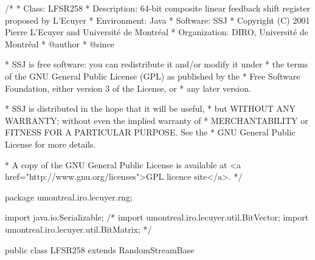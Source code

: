 \begin{code}
\begin{hide}
/*
 * Class:        LFSR258
 * Description:  64-bit composite linear feedback shift register proposed by L'Ecuyer
 * Environment:  Java
 * Software:     SSJ 
 * Copyright (C) 2001  Pierre L'Ecuyer and Université de Montréal
 * Organization: DIRO, Université de Montréal
 * @author       
 * @since

 * SSJ is free software: you can redistribute it and/or modify it under
 * the terms of the GNU General Public License (GPL) as published by the
 * Free Software Foundation, either version 3 of the License, or
 * any later version.

 * SSJ is distributed in the hope that it will be useful,
 * but WITHOUT ANY WARRANTY; without even the implied warranty of
 * MERCHANTABILITY or FITNESS FOR A PARTICULAR PURPOSE.  See the
 * GNU General Public License for more details.

 * A copy of the GNU General Public License is available at
   <a href="http://www.gnu.org/licenses">GPL licence site</a>.
 */
\end{hide}
package umontreal.iro.lecuyer.rng;  \begin{hide}

import java.io.Serializable;
/*
import umontreal.iro.lecuyer.util.BitVector;
import umontreal.iro.lecuyer.util.BitMatrix;
*/
\end{hide}

public class LFSR258 extends RandomStreamBase \begin{hide} {

   private static final long serialVersionUID = 70510L;
   //La date de modification a l'envers, lire 10/05/2007

    //private static final double NORM = 5.4210108624275221e-20;

    //equivalent a NORM = 1.0 / 0xFFFFFFFFFFFFF800L
    private static final double NORM = 0.5 / 0x7FFFFFFFFFFFFC00L;
    private static final double MAX = 0xFFFFFFFFFFFFF800L * NORM + 1.0;
    //MAX = plus grand double < 1.0

    private long z0, z1, z2, z3, z4;       // l'etat

    //stream and substream variables :
    private long[] stream;
    private long[] substream;
    private static long[] curr_stream = {1234567890L, 1234567890L,
                                         1234567890L, 1234567890L,
                                         1234567890L};

  \end{hide}
\end{code}


